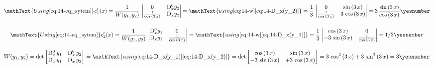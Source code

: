 \documentclass["AM3C-Slides_annotations.tex"]{subfiles}
\begin{document}
\begin{exampleBox}
  \begin{gather*}
    \mathText{Using \eqref{eq:14-eq_sytem}}
    c_1'(x)
    = \frac{1}{W(y_1,y_2)}
    \,\begin{vmatrix}
      0 
      &  \mdif[0]{x}y_2
      \\ \frac{1}{\cos{(3\,x)}}
      &  \mdif[1]{x}y_2
    \end{vmatrix}
    = 
    \mathText{using 
      \eqref{eq:14-w}
      \eqref{eq:14-D_x(y_2)}
    }
    = \frac{1}{3}
    \,\begin{vmatrix}
      0 
      &  \sin{(3\,x)}
      \\ \frac{1}{\cos{(3\,x)}}
      &  3\,\cos{(3\,x)}
    \end{vmatrix}
    = 3\,\frac{\sin{(3\,x)}}{\cos{(3\,x)}}
    \yesnumber\label{eq:14-c_1'}
    \\[3ex]
    \mathText{Using \eqref{eq:14-eq_sytem}}
    c_2'(x)
    = \frac{1}{W(y_1,y_2)}
    \,\begin{vmatrix}
      \mdif[0]{x}y_1
      &  0 
      \\ \mdif[1]{x}y_1
      &  \frac{1}{\cos{(3\,x)}}
    \end{vmatrix}
    =
    \mathText{using 
      \eqref{eq:14-w}
      \eqref{eq:14-D_x(y_1)}
    }
    = \frac{1}{3}
    \,\begin{vmatrix}
      \cos{(3\,x)}
      &  0 
      \\ -3\,\sin{(3\,x)}
      &  \frac{1}{\cos{(3\,x)}}
    \end{vmatrix}
    = 1/3
    \yesnumber\label{eq:14-c_2'}
  \end{gather*}

  \begin{gather*}
    W(y_1,y_2)
    = \det\begin{bmatrix}
      \mdif[0]{x}\,y_1
      &  \mdif[0]{x}\,y_2
      \\ \mdif[1]{x}\,y_1
      &  \mdif[1]{x}\,y_2
    \end{bmatrix}
    =
    \mathText{using 
      \eqref{eq:14-D_x(y_1)}
      \eqref{eq:14-D_x(y_2)}
    }
    = \det\begin{bmatrix}
      \cos{(3\,x)}
      &  \sin{(3\,x)}
      \\ -3\,\sin{(3\,x)}
      &  +3\,\cos{(3\,x)}
    \end{bmatrix}
    = 3\,\cos^2{(3\,x)}
    +3\,\sin^2{(3\,x)}
    = 3
    \yesnumber\label{eq:14-w}
  \end{gather*}


\end{exampleBox}
\end{document}
